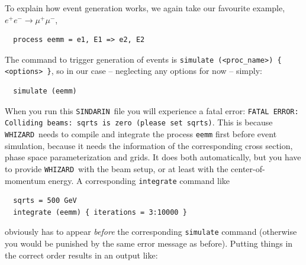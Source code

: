 \documentclass[12pt]{book}
\newcommand{\ttt}[1]{\texttt{#1}}
\newcommand{\whizard}{\ttt{WHIZARD}}
\newcommand{\sindarin}{\ttt{SINDARIN}}
\begin{document}
To explain how event generation works, we again take our favourite
example, $e^+e^- \to \mu^+ \mu^-$,
\begin{verbatim}
  process eemm = e1, E1 => e2, E2
\end{verbatim}
The command to trigger generation of events is \ttt{simulate
  (<proc\_name>) \{ <options> \}}, so in our case -- neglecting any
options for now -- simply:
\begin{verbatim}
  simulate (eemm)
\end{verbatim}
When you run this \sindarin\ file you will experience a fatal error:
\ttt{FATAL ERROR: Colliding beams: sqrts is zero (please set
sqrts)}. This is because \whizard\ needs to compile and integrate the
process \ttt{eemm} first before event simulation, because it needs the
information of the corresponding cross section, phase space
parameterization and grids. It does both automatically, but you have
to provide \whizard\ with the beam setup, or at least with the
center-of-momentum energy.  A corresponding \ttt{integrate} command
like
\begin{verbatim}
  sqrts = 500 GeV
  integrate (eemm) { iterations = 3:10000 }
\end{verbatim}
obviously has to appear {\em before} the corresponding \ttt{simulate}
command (otherwise you would be punished by the same error message as
before). Putting things in the correct order results in an output
like:
\end{document}
